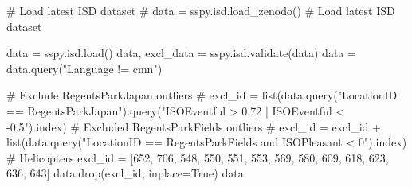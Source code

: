 \documentclass[
  letterpaper,
  DIV=11,
  numbers=noendperiod]{scrartcl}
\newenvironment{Shaded}{\begin{snugshade}}{\end{snugshade}}
\newcommand{\CommentTok}[1]{\textcolor[rgb]{0.37,0.37,0.37}{#1}}
\newcommand{\DecValTok}[1]{\textcolor[rgb]{0.68,0.00,0.00}{#1}}
\newcommand{\NormalTok}[1]{\textcolor[rgb]{0.00,0.23,0.31}{#1}}
\newcommand{\OperatorTok}[1]{\textcolor[rgb]{0.37,0.37,0.37}{#1}}
\newcommand{\StringTok}[1]{\textcolor[rgb]{0.13,0.47,0.30}{#1}}
\newcommand{\VariableTok}[1]{\textcolor[rgb]{0.07,0.07,0.07}{#1}}
\begin{document}
\begin{Shaded}
\begin{Highlighting}[]
\CommentTok{\# Load latest ISD dataset}
\CommentTok{\# data = sspy.isd.load\_zenodo()}
\CommentTok{\# Load latest ISD dataset}

\NormalTok{data }\OperatorTok{=}\NormalTok{ sspy.isd.load()}
\NormalTok{data, excl\_data }\OperatorTok{=}\NormalTok{ sspy.isd.validate(data)}
\NormalTok{data }\OperatorTok{=}\NormalTok{ data.query(}\StringTok{"Language != \textquotesingle{}cmn\textquotesingle{}"}\NormalTok{)}

\CommentTok{\# Exclude RegentsParkJapan outliers}
\CommentTok{\# excl\_id = list(data.query("LocationID == \textquotesingle{}RegentsParkJapan\textquotesingle{}").query("ISOEventful \textgreater{} 0.72 | ISOEventful \textless{} {-}0.5").index)}
\CommentTok{\# Excluded RegentsParkFields outliers}
\CommentTok{\# excl\_id = excl\_id + list(data.query("LocationID == \textquotesingle{}RegentsParkFields\textquotesingle{} and ISOPleasant \textless{} 0").index) \# Helicopters}
\NormalTok{excl\_id }\OperatorTok{=}\NormalTok{ [}\DecValTok{652}\NormalTok{, }\DecValTok{706}\NormalTok{, }\DecValTok{548}\NormalTok{, }\DecValTok{550}\NormalTok{, }\DecValTok{551}\NormalTok{, }\DecValTok{553}\NormalTok{, }\DecValTok{569}\NormalTok{, }\DecValTok{580}\NormalTok{, }\DecValTok{609}\NormalTok{, }\DecValTok{618}\NormalTok{, }\DecValTok{623}\NormalTok{, }\DecValTok{636}\NormalTok{, }\DecValTok{643}\NormalTok{]}
\NormalTok{data.drop(excl\_id, inplace}\OperatorTok{=}\VariableTok{True}\NormalTok{)}
\NormalTok{data}
\end{Highlighting}
\end{Shaded}
\end{document}
